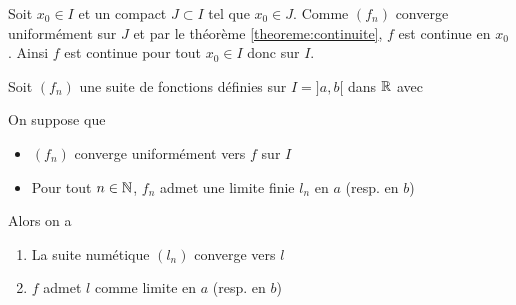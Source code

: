 \documentclass[a4paper,12pt]{article}
\begin{document}
\begin{demonstration}
    Soit $x_0 \in I$ et un compact $J \subset I$ tel que $x_0 \in J$.
    Comme $(f_n)$ converge uniformément sur $J$ et par le théorème \ref{theoreme:continuite}, $f$ est continue en $x_0$.
    Ainsi $f$ est continue pour tout $x_0 \in I$ donc sur $I$.
\end{demonstration}

\begin{corollaire}{}{}
    Soit $(f_n)$ une suite de fonctions définies sur $I = ]a, b[$ dans $\mathbb{R}$ avec 
    
    On suppose que
    \begin{itemize}[label=--]
        \item $(f_n)$ converge uniformément vers $f$ sur $I$
        \item Pour tout $n \in \mathbb{N}$, $f_n$ admet une limite finie $l_n$ en $a$ (resp. en $b$)
    \end{itemize}
    Alors on a
    \begin{enumerate}
        \item La suite numétique $(l_n)$ converge vers $l$
        \item $f$ admet $l$ comme limite en $a$ (resp. en $b$)
    \end{enumerate}
\end{corollaire}
\end{document}
